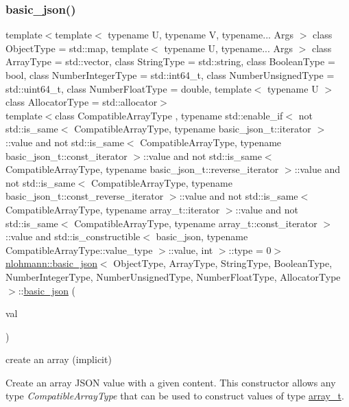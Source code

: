 \subsubsection{\texorpdfstring{basic\+\_\+json()}{basic\_json()}\hspace{0.1cm}{\footnotesize\ttfamily [6/23]}}
{\footnotesize\ttfamily template$<$template$<$ typename U, typename V, typename... Args $>$ class Object\+Type = std\+::map, template$<$ typename U, typename... Args $>$ class Array\+Type = std\+::vector, class String\+Type  = std\+::string, class Boolean\+Type  = bool, class Number\+Integer\+Type  = std\+::int64\+\_\+t, class Number\+Unsigned\+Type  = std\+::uint64\+\_\+t, class Number\+Float\+Type  = double, template$<$ typename U $>$ class Allocator\+Type = std\+::allocator$>$ \\
template$<$class Compatible\+Array\+Type , typename std\+::enable\+\_\+if$<$ not std\+::is\+\_\+same$<$ Compatible\+Array\+Type, typename basic\+\_\+json\+\_\+t\+::iterator $>$\+::value and not std\+::is\+\_\+same$<$ Compatible\+Array\+Type, typename basic\+\_\+json\+\_\+t\+::const\+\_\+iterator $>$\+::value and not std\+::is\+\_\+same$<$ Compatible\+Array\+Type, typename basic\+\_\+json\+\_\+t\+::reverse\+\_\+iterator $>$\+::value and not std\+::is\+\_\+same$<$ Compatible\+Array\+Type, typename basic\+\_\+json\+\_\+t\+::const\+\_\+reverse\+\_\+iterator $>$\+::value and not std\+::is\+\_\+same$<$ Compatible\+Array\+Type, typename array\+\_\+t\+::iterator $>$\+::value and not std\+::is\+\_\+same$<$ Compatible\+Array\+Type, typename array\+\_\+t\+::const\+\_\+iterator $>$\+::value and std\+::is\+\_\+constructible$<$ basic\+\_\+json, typename Compatible\+Array\+Type\+::value\+\_\+type $>$\+::value, int $>$\+::type  = 0$>$ \\
\hyperlink{classnlohmann_1_1basic__json}{nlohmann\+::basic\+\_\+json}$<$ Object\+Type, Array\+Type, String\+Type, Boolean\+Type, Number\+Integer\+Type, Number\+Unsigned\+Type, Number\+Float\+Type, Allocator\+Type $>$\+::\hyperlink{classnlohmann_1_1basic__json}{basic\+\_\+json} (\begin{DoxyParamCaption}\item[{const Compatible\+Array\+Type \&}]{val }\end{DoxyParamCaption})\hspace{0.3cm}{\ttfamily [inline]}}



create an array (implicit) 

Create an array J\+S\+ON value with a given content. This constructor allows any type {\itshape Compatible\+Array\+Type} that can be used to construct values of type \hyperlink{classnlohmann_1_1basic__json_ab00b882d39306d663c23dab110f5cae0}{array\+\_\+t}.


